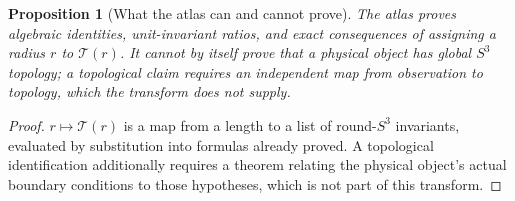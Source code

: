 \documentclass[11pt,a4paper]{article}
\newtheorem{proposition}[theorem]{Proposition}
\begin{document}
\begin{proposition}[What the atlas can and cannot prove]
The atlas proves algebraic identities, unit-invariant ratios, and exact consequences of assigning a radius $r$ to $\mathcal T(r)$.  It cannot by itself prove that a physical object has global $S^3$ topology; a topological claim requires an independent map from observation to topology, which the transform does not supply.
\end{proposition}
\begin{proof}
$r\mapsto\mathcal T(r)$ is a map from a length to a list of round-$S^3$ invariants, evaluated by substitution into formulas already proved.  A topological identification additionally requires a theorem relating the physical object's actual boundary conditions to those hypotheses, which is not part of this transform.
\end{proof}

\begin{center}
\scriptsize
{}
\end{center}
\end{document}
